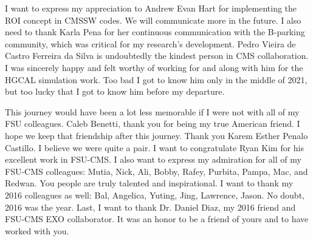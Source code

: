 \documentclass[11pt,expanded,copyright]{fsuthesis}
\begin{document}
\begin{acknowledgments}
I want to express my appreciation to Andrew Evan Hart for implementing the ROI concept
in CMSSW codes. We will communicate more in the future. I also need to thank Karla Pena
for her continuous communication with the B-parking community, which was critical for my research’s
development. Pedro Vieira de Castro Ferreira da Silva is undoubtedly the kindest person in CMS
collaboration. I was sincerely happy and felt worthy of working for and along with him for the
HGCAL simulation work. Too bad I got to know him only in the middle of 2021, but too lucky that I
got to know him before my departure.

This journey would have been a lot less memorable if I were not with all of my FSU colleagues.
Caleb Benetti, thank you for being my true American friend. 
I hope we keep that friendship after this journey. 
Thank you Karem Esther Penalo Castillo. I believe we were quite a pair. 
I want to congratulate Ryan Kim for his excellent work in FSU-CMS. 
I also want to express my admiration for all of my FSU-CMS colleagues: Mutia, Nick, Ali, Bobby, Rafey, Purbita, Pampa,
Mac, and Redwan. 
You people are truly talented and inspirational. 
I want to thank my 2016 colleagues as well: Bal, Angelica, Yuting, Jing, Lawrence, Jason. 
No doubt, 2016 was the year. 
Last, I want to thank Dr. Daniel Diaz, my 2016 friend and FSU-CMS EXO collaborator.
It was an honor to be a friend of yours and to have worked with you.


\end{acknowledgments}
\end{document}
